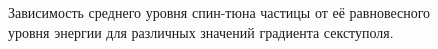 \begin{figure}[h]
	\centering
	\caption{Зависимость среднего уровня спин-тюна частицы от её равновесного уровня энергии для различных значений градиента секступоля.\label{fig:ST_vs_dkok_for_sext_strenghts}}
\end{figure}

